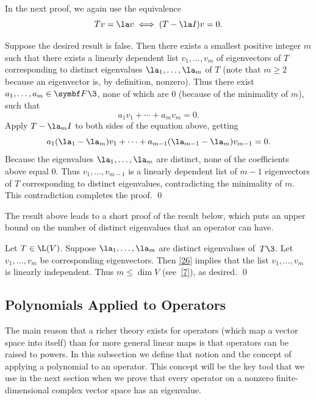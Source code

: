 In the next proof, we again use the equivalence
\[
Tv = \la v \iff (T - \la I)v = 0.
\]


\proof
Suppose the desired result is false. Then there exists a smallest positive integer $m$ such that there exists a linearly dependent list
$v_1, \ldots, v_m$ of eigenvectors of $T$ corresponding to distinct eigenvalues $\la_1, \ldots, \la_m$ of $T$ (note that $m\ge 2$ because an eigenvector is, by definition, nonzero). Thus there exist
$a_1, \ldots, a_m \in \F{}\3$, none of which are $0$ (because of the minimality of $m$), such that
\[
a_1 v_1 + \cdots + a_m v_m = 0.
\]
Apply $T - \la_m I$ to both sides of the equation above, getting
\[
a_1 (\la_1 - \la_m) v_1 + \cdots + a_{m-1} (\la_{m-1} - \la_m) v_{m-1} = 0.
\]
Because the eigenvalues $\la_1, \ldots, \la_m$ are distinct, none of the coefficients above equal $0$. Thus $v_1, \ldots, v_{m-1}$ is a linearly dependent list of $m-1$ eigenvectors of $T$ corresponding to distinct eigenvalues, contradicting the minimality of $m$. This contradiction completes the proof.
\qed

The result above leads to a short proof of the result below, which puts an upper bound on the number of distinct eigenvalues that an operator can have.


\proof
Let $T \in \L(V)$.  Suppose $\la_1, \dots, \la_m$ are distinct eigenvalues of~$T\3$.  Let $v_1, \dots, v_m$ be corresponding eigenvectors. Then \ref{26} implies that the list $v_1, \dots, v_m$ is linearly independent.  Thus $m \le \dim V$ (see~\ref{7}), as desired.
\qed

\pagebreak[3]

\subsection{Polynomials Applied to Operators}

The main reason that a richer theory exists for operators (which map a vector space into itself) than for more general linear maps is that
operators can be raised to powers.  In this subsection we define that notion and the concept of applying a polynomial to an operator. This concept will be the key tool that we use in the next section when we prove that every operator on a nonzero finite-dimensional complex vector space has an eigenvalue.


